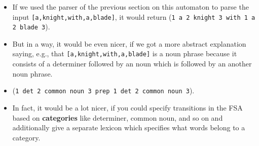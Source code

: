 \begin{frame}

	\frametitle{\insertsection}
	\framesubtitle{\insertsubsection}
	
	\begin{itemize}
		\item If we used the parser of the previous section on this automaton to parse the input \texttt{[a,knight,with,a,blade]}, it would return (\texttt{1 a 2 knight 3 with 1 a 2 blade 3}).
		\item But in a way, it would be even nicer, if we got a more abstract explanation saying, e.g., that \texttt{[a,knight,with,a,blade]} is a noun phrase because it consists of a determiner followed by an noun which is followed by an another noun phrase.
		\item (\texttt{1 det 2 common noun 3 prep 1 det 2 common noun 3}).
		\item In fact, it would be a lot nicer, if you could specify transitions in the FSA based on \textbf{categories} like determiner, common noun, and so on and additionally give a separate lexicon which specifies what words belong to a category.
	\end{itemize}


\end{frame}




